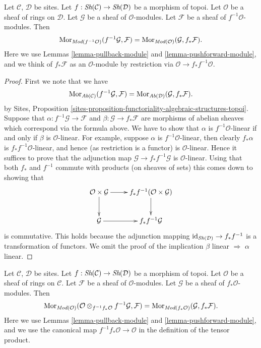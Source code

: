 \begin{lemma}
\label{lemma-adjoint-push-pull-modules}
Let $\mathcal{C}$, $\mathcal{D}$ be sites.
Let $f : \mathop{\textit{Sh}}\nolimits(\mathcal{C}) \to \mathop{\textit{Sh}}\nolimits(\mathcal{D})$
be a morphism of topoi.
Let $\mathcal{O}$ be a sheaf of rings on $\mathcal{D}$.
Let $\mathcal{G}$ be a sheaf of $\mathcal{O}$-modules.
Let $\mathcal{F}$ be a sheaf of $f^{-1}\mathcal{O}$-modules.
Then
$$
\mathop{\rm Mor}\nolimits_{\textit{Mod}(f^{-1}\mathcal{O})}(f^{-1}\mathcal{G}, \mathcal{F})
=
\mathop{\rm Mor}\nolimits_{\textit{Mod}(\mathcal{O})}(\mathcal{G}, f_*\mathcal{F}).
$$
Here we use
Lemmas \ref{lemma-pullback-module}
and \ref{lemma-pushforward-module}, and we think of
$f_*\mathcal{F}$ as an $\mathcal{O}$-module by restriction via
$\mathcal{O} \to f_*f^{-1}\mathcal{O}$.
\end{lemma}

\begin{proof}
First we note that we have
$$
\mathop{\rm Mor}\nolimits_{\textit{Ab}(\mathcal{C})}(f^{-1}\mathcal{G}, \mathcal{F})
=
\mathop{\rm Mor}\nolimits_{\textit{Ab}(\mathcal{D})}(\mathcal{G}, f_*\mathcal{F}).
$$
by Sites,
Proposition \ref{sites-proposition-functoriality-algebraic-structures-topoi}.
Suppose that $\alpha : f^{-1}\mathcal{G} \to \mathcal{F}$ and
$\beta : \mathcal{G} \to f_*\mathcal{F}$ are morphisms of abelian
sheaves which correspond via the formula above. We have to show that
$\alpha$ is $f^{-1}\mathcal{O}$-linear if and only if $\beta$
is $\mathcal{O}$-linear. For example, suppose $\alpha$ is
$f^{-1}\mathcal{O}$-linear, then clearly $f_*\alpha$ is
$f_*f^{-1}\mathcal{O}$-linear, and hence (as restriction is a functor)
is $\mathcal{O}$-linear. Hence it suffices to prove that the
adjunction map $\mathcal{G} \to f_*f^{-1}\mathcal{G}$ is
$\mathcal{O}$-linear. Using that both $f_*$ and $f^{-1}$ commute
with products (on sheaves of sets) this comes down to showing that
$$
\xymatrix{
\mathcal{O} \times \mathcal{G} \ar[r] \ar[d] &
f_*f^{-1}(\mathcal{O} \times \mathcal{G}) \ar[d] \\
\mathcal{G} \ar[r] & f_*f^{-1}\mathcal{G}
}
$$
is commutative. This holds because the adjunction mapping
$\text{id}_{\mathop{\textit{Sh}}\nolimits(\mathcal{D})} \to f_*f^{-1}$ is a
transformation of functors. We omit the proof of the implication
$\beta$ linear $\Rightarrow$ $\alpha$ linear.
\end{proof}

\begin{lemma}
\label{lemma-adjoint-pull-push-modules}
Let $\mathcal{C}$, $\mathcal{D}$ be sites.
Let $f : \mathop{\textit{Sh}}\nolimits(\mathcal{C}) \to \mathop{\textit{Sh}}\nolimits(\mathcal{D})$
be a morphism of topoi.
Let $\mathcal{O}$ be a sheaf of rings on $\mathcal{C}$.
Let $\mathcal{F}$ be a sheaf of $\mathcal{O}$-modules.
Let $\mathcal{G}$ be a sheaf of $f_*\mathcal{O}$-modules.
Then
$$
\mathop{\rm Mor}\nolimits_{\textit{Mod}(\mathcal{O})}(
\mathcal{O} \otimes_{f^{-1}f_*\mathcal{O}} f^{-1}\mathcal{G}, \mathcal{F})
=
\mathop{\rm Mor}\nolimits_{\textit{Mod}(f_*\mathcal{O})}(\mathcal{G}, f_*\mathcal{F}).
$$
Here we use
Lemmas \ref{lemma-pullback-module}
and \ref{lemma-pushforward-module}, and we use
the canonical map $f^{-1}f_*\mathcal{O} \to \mathcal{O}$
in the definition of the tensor product.
\end{lemma}


